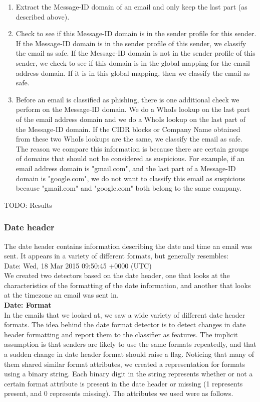 \documentclass[letterpaper]{article}
\begin{document}
\begin{enumerate}
\item Extract the Message-ID domain of an email and only keep the last part (as described above).
\item Check to see if this Message-ID domain is in the sender profile for this sender. If the Message-ID domain is in the sender profile of this sender, we classify the email as safe. If the Message-ID domain is not in the sender profile of this sender, we check to see if this domain is in the global mapping for the email address domain. If it is in this global mapping, then we classify the email as safe.
\item Before an email is classified as phishing, there is one additional check we perform on the Message-ID domain. We do a WhoIs lookup on the last part of the email address domain and we do a WhoIs lookup on the last part of the Message-ID domain. If the CIDR blocks or Company Name obtained from these two WhoIs lookups are the same, we classify the email as safe. The reason we compare this information is because there are certain groups of domains that should not be considered as suspicious. For example, if an email address domain is "gmail.com", and the last part of a Message-ID domain is "google.com", we do not want to classify this email as suspicious because "gmail.com" and "google.com" both belong to the same company.
\end{enumerate}

TODO: Results


\subsubsection{Date header}
The date header contains information describing the date and time an email was sent. It appears in a variety of different formats, but generally resembles:\\

Date: Wed, 18 Mar 2015 09:50:45 +0000 (UTC)\\

We created two detectors based on the date header, one that looks at the characteristics of the formatting of the date information, and another that looks at the timezone an email was sent in.\\

\textbf{Date: Format}\\

In the emails that we looked at, we saw a wide variety of different date header formats. The idea behind the date format detector is to detect changes in date header formatting and report them to the classifier as features. The implicit assumption is that senders are likely to use the same formats repeatedly, and that a sudden change in date header format should raise a flag. Noticing that many of them shared similar format attributes, we created a representation for formats using a binary string. Each binary digit in the string represents whether or not a certain format attribute is present in the date header or missing (1 represents present, and 0 represents missing). The attributes we used were as follows.\\
\end{document}
